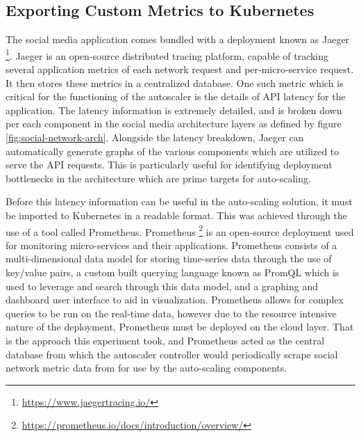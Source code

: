 \subsection{Exporting Custom Metrics to Kubernetes}
\label{subsec:metrics-export}

The social media application comes bundled with a deployment known as Jaeger \footnote{\url{https://www.jaegertracing.io/}}. Jaeger is an open-source distributed tracing platform, capable of tracking several application metrics of each network request and per-micro-service request. It then stores these metrics in a centralized database. One such metric which is critical for the functioning of the autoscaler is the details of API latency for the application. The latency information is extremely detailed, and is broken down per each component in the social media architecture layers as defined by figure \ref{fig:social-network-arch}. Alongside the latency breakdown, Jaeger can automatically generate graphs of the various components which are utilized to serve the API requests. This is particularly useful for identifying deployment bottlenecks in the architecture which are prime targets for auto-scaling.\par

Before this latency information can be useful in the auto-scaling solution, it must be imported to Kubernetes in a readable format. This was achieved through the use of a tool called Prometheus. Prometheus \footnote{\url{https://prometheus.io/docs/introduction/overview/}} is an open-source deployment used for monitoring micro-services and their applications. Prometheus consists of a multi-dimensional data model for storing time-series data through the use of key/value pairs, a custom built querying language known as PromQL which is used to leverage and search through this data model, and a graphing and dashboard user interface to aid in visualization. Prometheus allows for complex queries to be run on the real-time data, however due to the resource intensive nature of the deployment, Prometheus must be deployed on the cloud layer. That is the approach this experiment took, and Prometheus acted as the central database from which the autoscaler controller would periodically scrape social network metric data from for use by the auto-scaling components.\par

